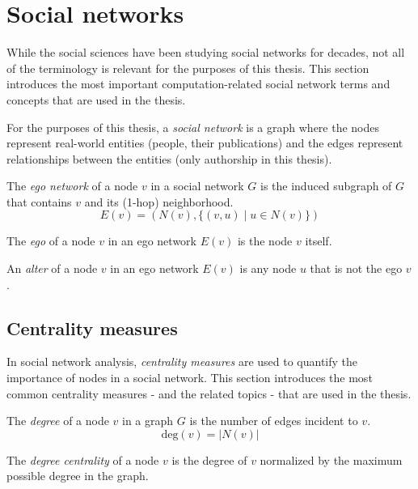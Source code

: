 \section{Social networks}

While the social sciences have been studying social networks for decades, not all of the terminology is relevant for the purposes of this thesis.
This section introduces the most important computation-related social network terms and concepts that are used in the thesis.

For the purposes of this thesis, a \textit{social network} is a graph where the nodes represent real-world entities (people, their publications) and the edges represent relationships between the entities (only authorship in this thesis).

\begin{definition}
    The \textit{ego network} of a node $v$ in a social network $G$ is the induced subgraph of $G$ that contains $v$ and its (1-hop) neighborhood.
    $$
    E(v) = (N(v), \{ (v, u) \mid u \in N(v) \})
    $$
\end{definition}

\begin{definition}
    The \textit{ego} of a node $v$ in an ego network $E(v)$ is the node $v$ itself.
\end{definition}

\begin{definition}
    An \textit{alter} of a node $v$ in an ego network $E(v)$ is any node $u$ that is not the ego $v$.
\end{definition}

\subsection{Centrality measures}

In social network analysis, \textit{centrality measures} are used to quantify the importance of nodes in a social network.
This section introduces the most common centrality measures - and the related topics - that are used in the thesis.

\begin{definition}
    \label{def:node-degree}
    The \textit{degree} of a node $v$ in a graph $G$ is the number of edges incident to $v$.
    $$
    \text{deg}(v) = |N(v)|
    $$

    The \textit{degree centrality} of a node $v$ is the degree of $v$ normalized by the maximum possible degree in the graph.
\end{definition}

